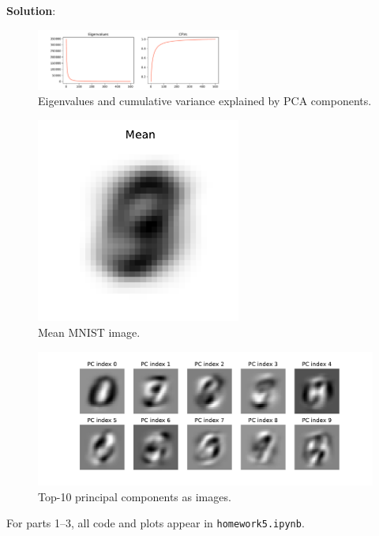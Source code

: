\documentclass[submit]{../harvardml}
\newenvironment{solution}{
    \vspace{2mm}
    \color{blue}\noindent\textbf{Solution}:
}{}
\begin{document}
\begin{solution}
\begin{figure}[ht]
  \centering
  \includegraphics[width=0.6\textwidth]{img_output/p3_cfvs.pdf}
  \caption{Eigenvalues and cumulative variance explained by PCA components.}
  \label{fig:cfvs}
\end{figure}

\begin{figure}[ht]
  \centering
  \includegraphics[width=0.6\textwidth]{img_output/p3_mean.pdf}
  \caption{Mean MNIST image.}
  \label{fig:mean-mnist}
\end{figure}

\begin{figure}[ht]
  \centering
  \includegraphics[width=\textwidth]{img_output/p3_pcomps.pdf}
  \caption{Top-10 principal components as images.}
  \label{fig:pc-images}
\end{figure}

For parts 1--3, all code and plots appear in \texttt{homework5.ipynb}. 


\end{solution}
\end{document}
